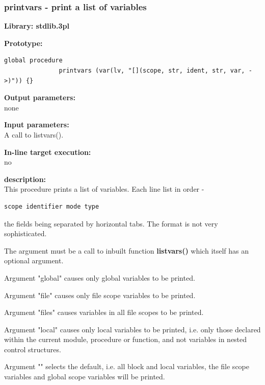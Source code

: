         \subsubsection{printvars - print a list of variables}\label{sec:lpprintvars}

            {\bf Library: stdlib.3pl}

            {\bf Prototype:} \\
            \vsp
            \begin{lstlisting}[gobble=12, language=threepl]
               global procedure
               printvars (var(lv, "[](scope, str, ident, str, var, ->)")) {}
            \end{lstlisting}

            {\bf Output parameters:} \\
            none

            {\bf Input parameters:} \\            
            A call to listvars().
        
            {\bf In-line target execution:} \\
            no

            {\bf description:} \\
            This procedure prints a list of variables. Each line list
            in order -
            \begin{lstlisting}[gobble=12, language=threepl]
               scope identifier mode type
            \end{lstlisting}
            the fields being separated by horizontal tabs. The format is
            not very sophisticated.

            The argument must be a call to inbuilt function
            {\bf listvars()}  which itself
            has an optional argument.

            Argument "global" causes only global variables to be printed.

            Argument "file" causes only file scope variables to be printed.

            Argument "files" causes variables in all file scopes to be printed.

            Argument "local" causes only local variables to be printed, i.e. only
            those declared within the current module, procedure or function, and
            not variables in nested control structures.

            Argument "" selects the default, i.e. all block and local variables,
            the file scope variables and global scope variables will be printed.

